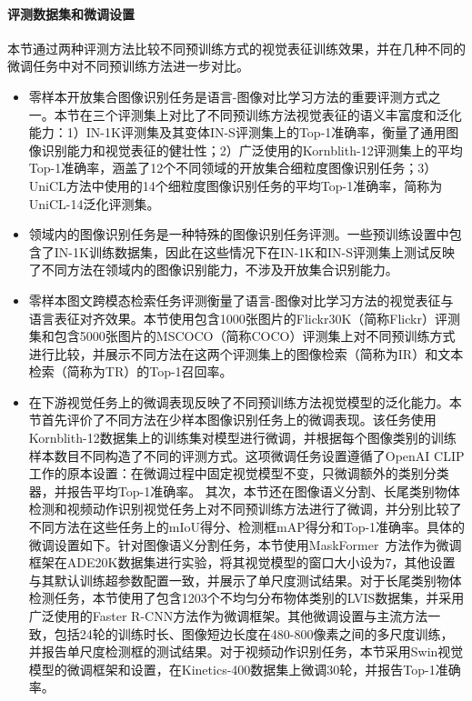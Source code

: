 \paragraph{评测数据集和微调设置} 本节通过两种评测方法比较不同预训练方式的视觉表征训练效果，并在几种不同的微调任务中对不同预训练方法进一步对比。
\begin{itemize}
    \item 零样本开放集合图像识别任务是语言-图像对比学习方法的重要评测方式之一。本节在三个评测集上对比了不同预训练方法视觉表征的语义丰富度和泛化能力：1）IN-1K评测集及其变体IN-S评测集\cite{wang2019learningSketch}上的Top-1准确率，衡量了通用图像识别能力和视觉表征的健壮性；2）广泛使用的Kornblith-12评测集\cite{imagnettransfer}上的平均Top-1准确率，涵盖了12个不同领域的开放集合细粒度图像识别任务；3）UniCL\cite{unicl}方法中使用的14个细粒度图像识别任务的平均Top-1准确率，简称为UniCL-14泛化评测集。
    \item 领域内的图像识别任务是一种特殊的图像识别任务评测。一些预训练设置中包含了IN-1K训练数据集，因此在这些情况下在IN-1K和IN-S评测集上测试反映了不同方法在领域内的图像识别能力，不涉及开放集合识别能力。
    \item 零样本图文跨模态检索任务评测衡量了语言-图像对比学习方法的视觉表征与语言表征对齐效果。本节使用包含1000张图片的Flickr30K\cite{young2014flickr}（简称Flickr）评测集和包含5000张图片的MSCOCO\cite{chen2015microsoft}（简称COCO）评测集上对不同预训练方式进行比较，并展示不同方法在这两个评测集上的图像检索（简称为IR）和文本检索（简称为TR）的Top-1召回率。
    \item 在下游视觉任务上的微调表现反映了不同预训练方法视觉模型的泛化能力。本节首先评价了不同方法在少样本图像识别任务上的微调表现。该任务使用Kornblith-12数据集上的训练集对模型进行微调，并根据每个图像类别的训练样本数目不同构造了不同的评测方式。这项微调任务设置遵循了OpenAI CLIP\cite{radford2021learning}工作的原本设置：在微调过程中固定视觉模型不变，只微调额外的类别分类器，并报告平均Top-1准确率。
    其次，本节还在图像语义分割、长尾类别物体检测和视频动作识别视觉任务上对不同预训练方法进行了微调，并分别比较了不同方法在这些任务上的mIoU得分、检测框mAP得分和Top-1准确率。具体的微调设置如下。针对图像语义分割任务，本节使用MaskFormer~\cite{maskformer}方法作为微调框架在ADE20K\cite{zhou2019ade}数据集进行实验，将其视觉模型的窗口大小设为7，其他设置与其默认训练超参数配置一致，并展示了单尺度测试结果。对于长尾类别物体检测任务，本节使用了包含1203个不均匀分布物体类别的LVIS数据集\cite{gupta2019lvis}，并采用广泛使用的Faster R-CNN\cite{ren2016faster}方法作为微调框架。其他微调设置与主流方法\cite{Swin}一致，包括24轮的训练时长、图像短边长度在480-800像素之间的多尺度训练，并报告单尺度检测框的测试结果。对于视频动作识别任务，本节采用Swin视觉模型的微调框架和设置，在Kinetics-400\cite{kay2017kinetics}数据集上微调30轮，并报告Top-1准确率。
\end{itemize}

